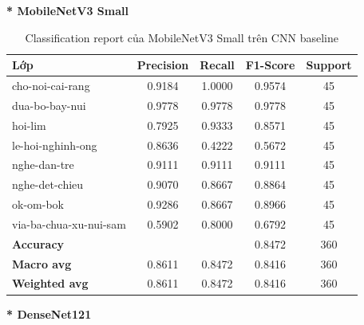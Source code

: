 \textbf{* MobileNetV3 Small}
\begin{table}[H]
\centering
\renewcommand{\arraystretch}{1.0}
\caption{Classification report của MobileNetV3 Small trên CNN baseline}
\label{tab:CRMobileNetV3Small}
\begin{tabular}{lcccc}
\hline
\textbf{Lớp} & \textbf{Precision} & \textbf{Recall} & \textbf{F1-Score} & \textbf{Support} \\
\hline
cho-noi-cai-rang          & 0.9184 & 1.0000 & 0.9574 & 45 \\
dua-bo-bay-nui            & 0.9778 & 0.9778 & 0.9778 & 45 \\
hoi-lim                   & 0.7925 & 0.9333 & 0.8571 & 45 \\
le-hoi-nghinh-ong         & 0.8636 & 0.4222 & 0.5672 & 45 \\
nghe-dan-tre              & 0.9111 & 0.9111 & 0.9111 & 45 \\
nghe-det-chieu            & 0.9070 & 0.8667 & 0.8864 & 45 \\
ok-om-bok                 & 0.9286 & 0.8667 & 0.8966 & 45 \\
via-ba-chua-xu-nui-sam    & 0.5902 & 0.8000 & 0.6792 & 45 \\
\hline
\textbf{Accuracy}         &        &        & 0.8472 & 360 \\
\textbf{Macro avg}        & 0.8611 & 0.8472 & 0.8416 & 360 \\
\textbf{Weighted avg}     & 0.8611 & 0.8472 & 0.8416 & 360 \\
\hline
\end{tabular}
\end{table}
\newpage
\textbf{* DenseNet121}
